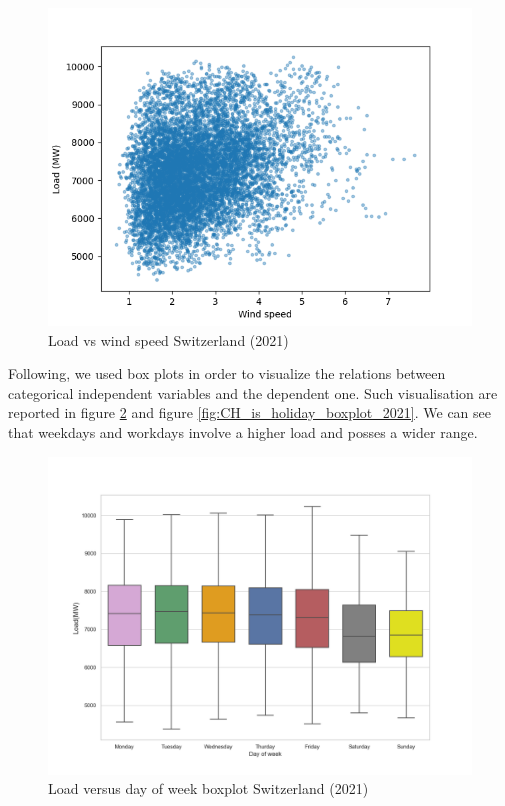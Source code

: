 \begin{figure}[!h]
    \includegraphics[width=\textwidth]{images/CH_load_vs_wind_speed_2021.png}
    \caption{Load vs wind speed Switzerland (2021)}
    \label{fig:CH_load_vs_wind_speed_2021}
\end{figure}

Following, we used box plots in order to visualize the relations between categorical independent variables and the dependent one. Such visualisation are reported in figure \ref{fig:CH_day_of_week_boxplot_2021} and figure \ref{fig:CH_is_holiday_boxplot_2021}. We can see that weekdays and workdays involve a higher load and posses a wider range.

\begin{figure}[!h]
    \includegraphics[width=\textwidth]{images/CH_day_of_week_boxplot_2021.png}
    \caption{Load versus day of week boxplot Switzerland (2021)}
    \label{fig:CH_day_of_week_boxplot_2021}
\end{figure}

